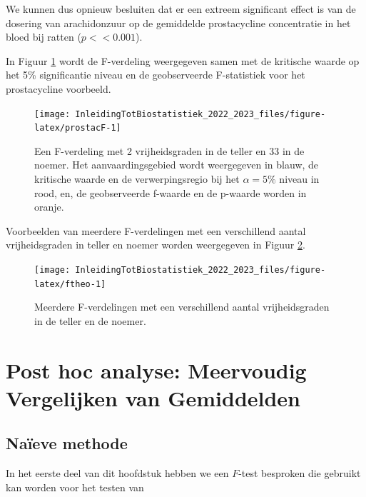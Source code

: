 \documentclass[
  12pt,dutch,coursenotes]{book}
\begin{document}
We kunnen dus opnieuw besluiten dat er een extreem significant effect is van de dosering van arachidonzuur op de gemiddelde prostacycline concentratie in het bloed bij ratten (\(p<<0.001\)).

In Figuur \ref{fig:prostacF} wordt de F-verdeling weergegeven samen met de kritische waarde op het 5\% significantie niveau en de geobserveerde F-statistiek voor het prostacycline voorbeeld.\\

\begin{figure}

{\centering \texttt{[image: InleidingTotBiostatistiek\_2022\_2023\_files/figure-latex/prostacF-1]} 

}

\caption{Een F-verdeling met 2 vrijheidsgraden in de teller en 33 in de noemer. Het aanvaardingsgebied wordt weergegeven in blauw, de kritische waarde en de verwerpingsregio bij het $\alpha=5\%$ niveau in rood, en, de geobserveerde f-waarde  en de p-waarde worden in oranje.}\label{fig:prostacF}
\end{figure}

Voorbeelden van meerdere F-verdelingen met een verschillend aantal vrijheidsgraden in teller en noemer worden weergegeven in Figuur \ref{fig:ftheo}.

\begin{figure}

{\centering \texttt{[image: InleidingTotBiostatistiek\_2022\_2023\_files/figure-latex/ftheo-1]} 

}

\caption{Meerdere F-verdelingen met een verschillend aantal vrijheidsgraden in de teller en de noemer.}\label{fig:ftheo}
\end{figure}

\hypertarget{post-hoc-analyse-meervoudig-vergelijken-van-gemiddelden}{%
\section{Post hoc analyse: Meervoudig Vergelijken van Gemiddelden}\label{post-hoc-analyse-meervoudig-vergelijken-van-gemiddelden}}

\hypertarget{nauxefeve-methode}{%
\subsection{Naïeve methode}\label{nauxefeve-methode}}

In het eerste deel van dit hoofdstuk hebben we een \(F\)-test besproken die gebruikt kan worden voor het testen van
\end{document}
